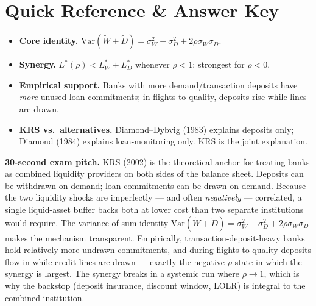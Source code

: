 \documentclass[11pt]{article}
\newcommand{\Var}{\mathrm{Var}}
\begin{document}
\section*{Quick Reference \& Answer Key}
\begin{answerbox}
\begin{itemize}
\item \textbf{Core identity.} $\Var(\tilde W + \tilde D) = \sigma_W^2 + \sigma_D^2 + 2\rho\sigma_W\sigma_D$.
\item \textbf{Synergy.} $L^*(\rho)<L^*_W+L^*_D$ whenever $\rho<1$; strongest for $\rho<0$.
\item \textbf{Empirical support.} Banks with more demand/transaction deposits have \emph{more} unused loan commitments; in flights-to-quality, deposits rise while lines are drawn.
\item \textbf{KRS vs.\ alternatives.} Diamond--Dybvig (1983) explains deposits only; Diamond (1984) explains loan-monitoring only. KRS is the joint explanation.
\end{itemize}
\end{answerbox}

\begin{keybox}
\textbf{30-second exam pitch.} KRS (2002) is the theoretical anchor for treating banks as combined liquidity providers on both sides of the balance sheet. Deposits can be withdrawn on demand; loan commitments can be drawn on demand. Because the two liquidity shocks are imperfectly --- and often \emph{negatively} --- correlated, a single liquid-asset buffer backs both at lower cost than two separate institutions would require. The variance-of-sum identity $\Var(\tilde W+\tilde D)=\sigma_W^2+\sigma_D^2+2\rho\sigma_W\sigma_D$ makes the mechanism transparent. Empirically, transaction-deposit-heavy banks hold relatively more undrawn commitments, and during flights-to-quality deposits flow in while credit lines are drawn --- exactly the negative-$\rho$ state in which the synergy is largest. The synergy breaks in a systemic run where $\rho\to 1$, which is why the backstop (deposit insurance, discount window, LOLR) is integral to the combined institution.
\end{keybox}
\end{document}
